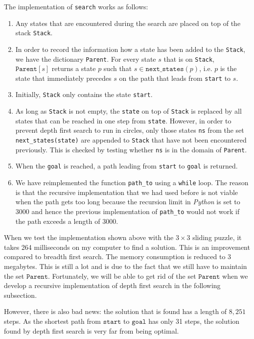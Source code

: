The implementation of  \texttt{search} works as follows:
\begin{enumerate}
\item Any states that are encountered during the search are placed on top of the stack \texttt{Stack}.
\item In order to record the information how a state has been added to the \texttt{Stack}, we have the dictionary
      \texttt{Parent}.  For every state $s$ that is on \texttt{Stack}, $\texttt{Parent}[s]$ returns a state $p$
      such that $s \in \texttt{next\_states}(p)$,  i.e. $p$ is the state that immediately precedes $s$ on the
      path that leads from \texttt{start} to $s$.  
\item Initially, \texttt{Stack} only contains the state \texttt{start}.
\item As long as \texttt{Stack} is not empty, the \texttt{state} on top of \texttt{Stack} is replaced by all
      states that can be reached in one step from \texttt{state}.  However, in order to prevent depth first search
      to run in circles, only those states \texttt{ns} from the set \texttt{next\_states(state)} are appended to
      \texttt{Stack} that have not been encountered previously.  This is checked by testing 
      whether \texttt{ns} is in the domain of \texttt{Parent}.
\item When the \texttt{goal} is reached,  a path leading from \texttt{start} to \texttt{goal} is returned.
\item We have reimplemented the function \texttt{path\_to} using a \texttt{while} loop.  The reason is that 
      the recursive implementation that we had used before is not viable when the path gets too long because
      the recursion limit in \textsl{Python} is set to 3000 and hence the previous implementation of
      \texttt{path\_to} would not work if the path exceeds a length of $3000$.
\end{enumerate}
When we test the implementation shown above with the $3 \times 3$ sliding puzzle, it takes 264 milliseconds 
on my computer to find a solution.  This is an improvement compared to breadth first search.
The memory consumption is reduced to 3 megabytes.  This is still a lot and is due to the fact that we still
have to maintain the set $\texttt{Parent}$.  Fortunately, we will 
be able to get rid of the set $\texttt{Parent}$ when we develop a recursive implementation of depth first
search in the following subsection. 

However, there is also bad news: the solution that is found has a length of $8,251$ steps.  As the
shortest path from $\texttt{start}$ to $\texttt{goal}$ has only 31 steps, the solution found by depth
first search is very far from being optimal.

